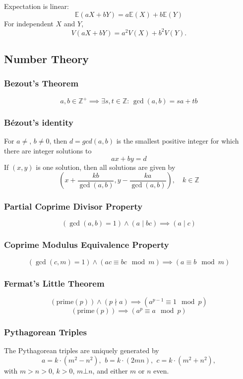 \documentclass[
	a4paper,
	landscape,
	10pt,
]{article}
\begin{document}
\begin{multicols}{3}
	Expectation is linear:
	\[\mathbb{E}(aX+bY) = a\mathbb{E}(X)+b\mathbb{E}(Y)\]
	For independent $X$ and $Y$, \[V(aX+bY) = a^2V(X)+b^2V(Y).\]

    \subsection{Number Theory}
        \subsubsection*{Bezout's Theorem}
        $$
        a,b \in \mathbb{Z^+} \implies \exists s,t \in \mathbb{Z}: \, \gcd(a,b) = sa + tb
        $$
        \subsubsection*{Bézout's identity}
	For $a \neq $, $b \neq 0$, then $d=gcd(a,b)$ is the smallest positive integer for which there are integer solutions to
	$$ax+by=d$$
	If $(x,y)$ is one solution, then all solutions are given by
	$$\left(x+\frac{kb}{\gcd(a,b)}, y-\frac{ka}{\gcd(a,b)}\right), \quad k\in\mathbb{Z}$$

        \subsubsection*{Partial Coprime Divisor Property}
        $$
        (\gcd(a,b)=1) \land (a \mid bc) \implies (a \mid c)
        $$
        \subsubsection*{Coprime Modulus Equivalence Property}
        $$
        (\gcd(c,m)=1) \land (ac \equiv bc \mod m) \implies (a \equiv b \mod m)
        $$
        \subsubsection*{Fermat's Little Theorem}
        $$
        (\text{prime}(p)) \land (p \nmid a) \implies (a^{p-1} \equiv 1 \mod p)
        $$
        $$
        (\text{prime}(p)) \implies (a^p \equiv a \mod p) 
        $$


\subsubsection*{Pythagorean Triples}
 The Pythagorean triples are uniquely generated by
 \[ a=k\cdot (m^{2}-n^{2}),\ \,b=k\cdot (2mn),\ \,c=k\cdot (m^{2}+n^{2}), \]
 with $m > n > 0$, $k > 0$, $m \bot n$, and either $m$ or $n$ even.


\end{multicols}
\end{document}
